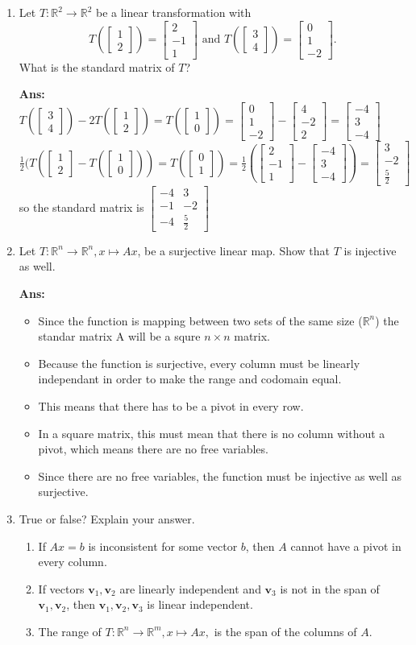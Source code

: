 \documentclass[12pt,a4paper]{amsart}
\newcommand{\bv}{\mathbf v}
\newcommand{\R}{\mathbb{R}}
\newcommand\sol[1]{
\medskip
\begin{mdframed}
\textbf{Ans:\\} #1
\end{mdframed}
\medskip
}
\newcommand{\vt}[2]{\left[\begin{matrix} #1 \\ #2 \end{matrix}\right]}
\newcommand{\vd}[3]{\left[\begin{matrix} #1 \\ #2 \\ #3 \end{matrix}\right]}
\begin{document}
\begin{enumerate}
\item
 Let $T\colon \R^2\to\R^2$ be a linear transformation with
\[ T(\vt{1}{2}) = \vd{2}{-1}{1}\text{ and } T(\vt{3}{4}) = \vd{0}{1}{-2}. \]
 What is the standard matrix of $T$?

\sol{
  $T(\vt{3}{4})-2T(\vt{1}{2})=T(\vt{1}{0})=\vd{0}{1}{-2}-\vd{4}{-2}{2}=\vd{-4}{3}{-4}$\\
  $\frac{1}{2}(T(\vt{1}{2}-T(\vt{1}{0}))=T(\vt{0}{1})=\frac{1}{2}(\vd{2}{-1}{1}-\vd{-4}{3}{-4})=\vd{3}{-2}{\frac{5}{2}}$\\
  so the standard matrix is $\left[\begin{matrix} -4 & 3 \\ -1 & -2 \\ -4 & \frac{5}{2} \end{matrix}\right]$

}
 
\item
 Let $T\colon \R^n\to\R^n, x\mapsto Ax$, be a surjective linear map. Show that $T$ is injective as well.  
 \sol{ \begin{itemize}
     \item Since the function is mapping between two sets of the same size ($\R^n$) the standar matrix A will be a squre $n\times n$ matrix.\\
     \item Because the function is surjective, every column must be linearly independant in order to make the range and codomain equal.\\
     \item This means that there has to be a pivot in every row.\\
     \item In a square matrix, this must mean that there is no column without a pivot, which means there are no free variables.\\
     \item Since there are no free variables, the function must be injective as well as surjective.
 \end{itemize} 
}

\item
 True or false? Explain your answer.
\begin{enumerate}
\item 
 If $Ax=b$ is inconsistent for some vector $b$, then $A$ cannot have a pivot in every column.
   
\item
  If vectors $\bv_1,\bv_2$ are linearly independent and $\bv_3$ is not in the span of $\bv_1,\bv_2$,
  then $\bv_1,\bv_2,\bv_3$ is linear independent.
\item
 The range of $T\colon\R^n\to\R^m, x\mapsto Ax,$ is the span of the columns of $A$.  
\end{enumerate}


\end{enumerate}
\end{document}
